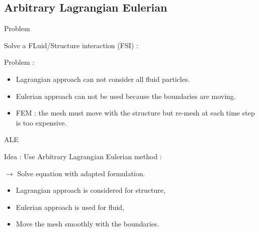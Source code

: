 \subsection{Arbitrary Lagrangian Eulerian}
\begin{frame}{Problem}

\begin{block}{}
Solve a FLuid/Structure interaction (FSI) :
\end{block}


\begin{block}{Problem :}

\begin{itemize}
\item Lagrangian approach can not consider all fluid particles.

\item Eulerian approach can not be used because the boundaries are moving.

\item FEM : the mesh must move with the structure but re-mesh at each time step is too expensive.
\end{itemize}
\end{block}
\end{frame}


\begin{frame}{ALE}

\begin{block}{Idea : }
Use Arbitrary Lagrangian Eulerian method :

$\rightarrow$ Solve equation with adapted formulation.
\end{block}

\begin{itemize}
\item Lagrangian approach is considered for structure,

\item Eulerian approach is used for fluid,

\item Move the mesh smoothly with the boundaries.
\end{itemize}
\end{frame}


